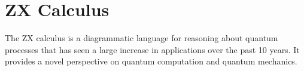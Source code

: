 \chapter{\label{zx-calculus}ZX Calculus}

The ZX calculus is a diagrammatic language for reasoning about quantum processes that has seen a large increase in applications over the past 10 years. It provides a novel perspective on quantum computation and quantum mechanics.
